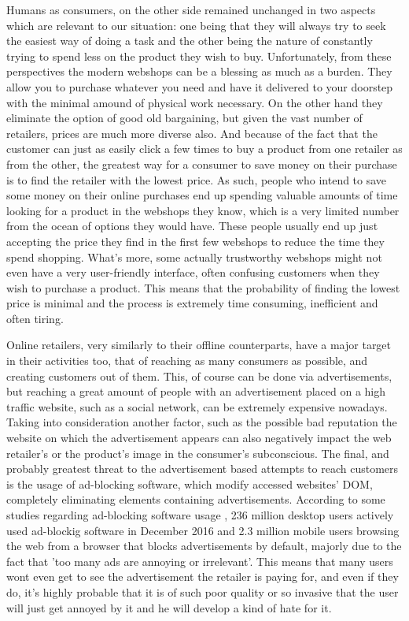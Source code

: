 \documentclass[12pt,a4paper,twoside]{report}
\begin{document}
Humans as consumers, on the other side remained unchanged in two aspects which are relevant to our situation: one being that they will always try to seek the easiest way of doing a task and the other being the nature of constantly trying to spend less on the product they wish to buy. Unfortunately, from these perspectives the modern webshops can be a blessing as much as a burden. They allow you to purchase whatever you need and have it delivered to your doorstep with the minimal amound of physical work necessary. On the other hand they eliminate the option of good old bargaining, but given the vast number of retailers, prices are much more diverse also. And because of the fact that the customer can just as easily click a few times to buy a product from one retailer as from the other, the greatest way for a consumer to save money on their purchase is to find the retailer with the lowest price. As such, people who intend to save some money on their online purchases end up spending valuable amounts of time looking for a product in the webshops they know, which is a very limited number from the ocean of options they would have. These people usually end up just accepting the price they find in the first few webshops to reduce the time they spend shopping. What's more, some actually trustworthy webshops might not even have a very user-friendly interface, often confusing customers when they wish to purchase a product. This means that the probability of finding the lowest price is minimal and the process is extremely time consuming, inefficient and often tiring.

Online retailers, very similarly to their offline counterparts, have a major target in their activities too, that of reaching as many consumers as possible, and creating customers out of them. This, of course can be done via advertisements, but reaching a great amount of people with an advertisement placed on a high traffic website, such as a social network, can be extremely expensive nowadays. Taking into consideration another factor, such as the possible bad reputation the website on which the advertisement appears can also negatively impact the web retailer's or the product's image in the consumer's subconscious. The final, and probably greatest threat to the advertisement based attempts to reach customers is the usage of ad-blocking software, which modify accessed websites' DOM, completely eliminating elements containing advertisements. According to some studies regarding ad-blocking software usage \cite{adblock_stats}, 236 million desktop users actively used ad-blockig software in December 2016 and 2.3 million mobile users browsing the web from a browser that blocks advertisements by default, majorly due to the fact that 'too many ads are annoying or irrelevant'. This means that many users wont even get to see the advertisement the retailer is paying for, and even if they do, it's highly probable that it is of such poor quality or so invasive that the user will just get annoyed by it and he will develop a kind of hate for it.
\end{document}
